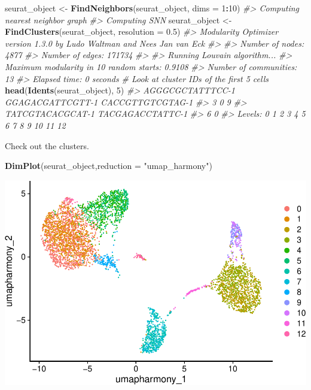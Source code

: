\documentclass[
]{book}
\newenvironment{Shaded}{\begin{snugshade}}{\end{snugshade}}
\newcommand{\AttributeTok}[1]{\textcolor[rgb]{0.13,0.29,0.53}{#1}}
\newcommand{\CommentTok}[1]{\textcolor[rgb]{0.56,0.35,0.01}{\textit{#1}}}
\newcommand{\DecValTok}[1]{\textcolor[rgb]{0.00,0.00,0.81}{#1}}
\newcommand{\FloatTok}[1]{\textcolor[rgb]{0.00,0.00,0.81}{#1}}
\newcommand{\FunctionTok}[1]{\textcolor[rgb]{0.13,0.29,0.53}{\textbf{#1}}}
\newcommand{\NormalTok}[1]{#1}
\newcommand{\OtherTok}[1]{\textcolor[rgb]{0.56,0.35,0.01}{#1}}
\newcommand{\SpecialCharTok}[1]{\textcolor[rgb]{0.81,0.36,0.00}{\textbf{#1}}}
\newcommand{\StringTok}[1]{\textcolor[rgb]{0.31,0.60,0.02}{#1}}
\begin{document}
\begin{Shaded}
\begin{Highlighting}[]
\NormalTok{seurat\_object }\OtherTok{\textless{}{-}} \FunctionTok{FindNeighbors}\NormalTok{(seurat\_object, }\AttributeTok{dims =} \DecValTok{1}\SpecialCharTok{:}\DecValTok{10}\NormalTok{)}
\CommentTok{\#\textgreater{} Computing nearest neighbor graph}
\CommentTok{\#\textgreater{} Computing SNN}
\NormalTok{seurat\_object }\OtherTok{\textless{}{-}} \FunctionTok{FindClusters}\NormalTok{(seurat\_object, }\AttributeTok{resolution =} \FloatTok{0.5}\NormalTok{)}
\CommentTok{\#\textgreater{} Modularity Optimizer version 1.3.0 by Ludo Waltman and Nees Jan van Eck}
\CommentTok{\#\textgreater{} }
\CommentTok{\#\textgreater{} Number of nodes: 4877}
\CommentTok{\#\textgreater{} Number of edges: 171734}
\CommentTok{\#\textgreater{} }
\CommentTok{\#\textgreater{} Running Louvain algorithm...}
\CommentTok{\#\textgreater{} Maximum modularity in 10 random starts: 0.9108}
\CommentTok{\#\textgreater{} Number of communities: 13}
\CommentTok{\#\textgreater{} Elapsed time: 0 seconds}
\CommentTok{\# Look at cluster IDs of the first 5 cells}
\FunctionTok{head}\NormalTok{(}\FunctionTok{Idents}\NormalTok{(seurat\_object), }\DecValTok{5}\NormalTok{)}
\CommentTok{\#\textgreater{} AGGGCGCTATTTCC{-}1 GGAGACGATTCGTT{-}1 CACCGTTGTCGTAG{-}1 }
\CommentTok{\#\textgreater{}                3                0                9 }
\CommentTok{\#\textgreater{} TATCGTACACGCAT{-}1 TACGAGACCTATTC{-}1 }
\CommentTok{\#\textgreater{}                6                0 }
\CommentTok{\#\textgreater{} Levels: 0 1 2 3 4 5 6 7 8 9 10 11 12}
\end{Highlighting}
\end{Shaded}

Check out the clusters.

\begin{Shaded}
\begin{Highlighting}[]
\FunctionTok{DimPlot}\NormalTok{(seurat\_object,}\AttributeTok{reduction =} \StringTok{"umap\_harmony"}\NormalTok{)}
\end{Highlighting}
\end{Shaded}

\includegraphics{scRNAseqInR_ABACBS_2024_Doco_files/figure-latex/unnamed-chunk-19-1.pdf}
\end{document}
